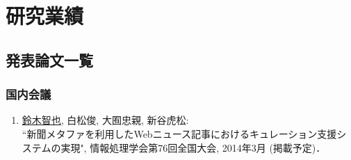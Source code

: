 \chapter*{研究業績}
\label{chap:研究業績}


\section*{発表論文一覧}
\label{chap:発表論文一覧}



\subsection*{国内会議}
\begin{enumerate}
\item  \underline{鈴木智也}, 白松俊, 大囿忠親, 新谷虎松:\\
``新聞メタファを利用したWebニュース記事におけるキュレーション支援システムの実現", 情報処理学会第76回全国大会, 2014年3月 (掲載予定)．

\end{enumerate}
